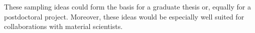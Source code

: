 \documentclass[11pt]{article}
\begin{document}

%

\noindent These sampling ideas could form the basis for a graduate thesis or, equally for a postdoctoral project.  Moreover, these ideas would be especially well suited for collaborations with material scientists.  
%
\end{document}
